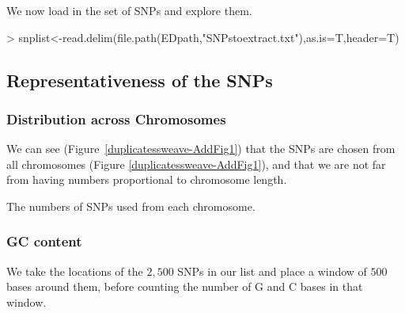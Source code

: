 \documentclass{article}
\begin{document}
We now load in the set of SNPs and explore them.

\begin{Schunk}
\begin{Sinput}
> snplist<-read.delim(file.path(EDpath,"SNPstoextract.txt"),as.is=T,header=T)
\end{Sinput}
\end{Schunk}


\subsection{Representativeness of the SNPs}

\subsubsection{Distribution across Chromosomes}
We can see (Figure~\ref{duplicatessweave-AddFig1}) that the SNPs are chosen from all chromosomes (Figure \ref{duplicatessweave-AddFig1}), and that we are not far from having numbers proportional to chromosome length.

\begin{Schunk}
\end{Schunk}

{The numbers of SNPs used from each chromosome.}

\subsubsection{GC content}

We take the locations of the $2,500$ SNPs in our list and place a window of $500$ bases around them, before counting the number of G and C bases in that window.

\begin{Schunk}
\end{Schunk}
\end{document}
